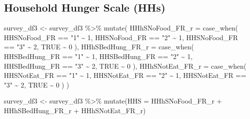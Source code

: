 \documentclass[
  letterpaper,
  DIV=11,
  numbers=noendperiod]{scrreprt}
\newenvironment{Shaded}{\begin{snugshade}}{\end{snugshade}}
\newcommand{\AttributeTok}[1]{\textcolor[rgb]{0.40,0.45,0.13}{#1}}
\newcommand{\ConstantTok}[1]{\textcolor[rgb]{0.56,0.35,0.01}{#1}}
\newcommand{\DecValTok}[1]{\textcolor[rgb]{0.68,0.00,0.00}{#1}}
\newcommand{\FunctionTok}[1]{\textcolor[rgb]{0.28,0.35,0.67}{#1}}
\newcommand{\NormalTok}[1]{\textcolor[rgb]{0.00,0.23,0.31}{#1}}
\newcommand{\OtherTok}[1]{\textcolor[rgb]{0.00,0.23,0.31}{#1}}
\newcommand{\SpecialCharTok}[1]{\textcolor[rgb]{0.37,0.37,0.37}{#1}}
\newcommand{\StringTok}[1]{\textcolor[rgb]{0.13,0.47,0.30}{#1}}
\begin{document}
\subsection{Household Hunger Scale
(HHs)}\label{household-hunger-scale-hhs}

\begin{Shaded}
\begin{Highlighting}[]
\NormalTok{survey\_df3 }\OtherTok{\textless{}{-}}\NormalTok{ survey\_df3 }\SpecialCharTok{\%\textgreater{}\%}
  \FunctionTok{mutate}\NormalTok{(}
    \AttributeTok{HHhSNoFood\_FR\_r =} \FunctionTok{case\_when}\NormalTok{(}
\NormalTok{      HHSNoFood\_FR }\SpecialCharTok{==} \StringTok{"1"} \SpecialCharTok{\textasciitilde{}} \DecValTok{1}\NormalTok{,}
\NormalTok{      HHSNoFood\_FR }\SpecialCharTok{==} \StringTok{"2"} \SpecialCharTok{\textasciitilde{}} \DecValTok{1}\NormalTok{,}
\NormalTok{      HHSNoFood\_FR }\SpecialCharTok{==} \StringTok{"3"} \SpecialCharTok{\textasciitilde{}} \DecValTok{2}\NormalTok{,}
      \ConstantTok{TRUE} \SpecialCharTok{\textasciitilde{}} \DecValTok{0}
\NormalTok{    ),}
    \AttributeTok{HHhSBedHung\_FR\_r =} \FunctionTok{case\_when}\NormalTok{(}
\NormalTok{      HHSBedHung\_FR }\SpecialCharTok{==} \StringTok{"1"} \SpecialCharTok{\textasciitilde{}} \DecValTok{1}\NormalTok{,}
\NormalTok{      HHSBedHung\_FR }\SpecialCharTok{==} \StringTok{"2"} \SpecialCharTok{\textasciitilde{}} \DecValTok{1}\NormalTok{,}
\NormalTok{      HHSBedHung\_FR }\SpecialCharTok{==} \StringTok{"3"} \SpecialCharTok{\textasciitilde{}} \DecValTok{2}\NormalTok{,}
      \ConstantTok{TRUE} \SpecialCharTok{\textasciitilde{}} \DecValTok{0}
\NormalTok{    ),}
    \AttributeTok{HHhSNotEat\_FR\_r =} \FunctionTok{case\_when}\NormalTok{(}
\NormalTok{      HHSNotEat\_FR }\SpecialCharTok{==} \StringTok{"1"} \SpecialCharTok{\textasciitilde{}} \DecValTok{1}\NormalTok{,}
\NormalTok{      HHSNotEat\_FR }\SpecialCharTok{==} \StringTok{"2"} \SpecialCharTok{\textasciitilde{}} \DecValTok{1}\NormalTok{,}
\NormalTok{      HHSNotEat\_FR }\SpecialCharTok{==} \StringTok{"3"} \SpecialCharTok{\textasciitilde{}} \DecValTok{2}\NormalTok{,}
      \ConstantTok{TRUE} \SpecialCharTok{\textasciitilde{}} \DecValTok{0}
\NormalTok{    )}
\NormalTok{  )}

\NormalTok{survey\_df3 }\OtherTok{\textless{}{-}}\NormalTok{ survey\_df3 }\SpecialCharTok{\%\textgreater{}\%}
  \FunctionTok{mutate}\NormalTok{(}\AttributeTok{HHS =}\NormalTok{ HHhSNoFood\_FR\_r }\SpecialCharTok{+}\NormalTok{ HHhSBedHung\_FR\_r }\SpecialCharTok{+}\NormalTok{ HHhSNotEat\_FR\_r)}


\end{Highlighting}
\end{Shaded}
\end{document}
